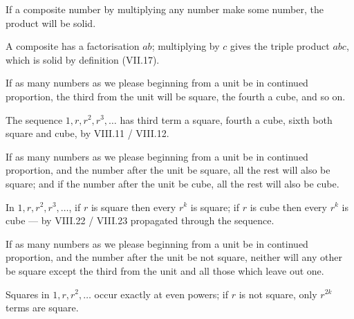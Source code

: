 \documentclass{rrxiv}
\begin{document}
\begin{claim}
\label{prop:IX.7}
If a composite number by multiplying any number make some number,
the product will be solid.
\end{claim}
\begin{evidence}[Proof of IX.7]
\label{ev:IX.7}
A composite has a factorisation $ab$; multiplying by $c$ gives the
triple product $abc$, which is solid by definition (VII.17).
\end{evidence}

\begin{claim}
\label{prop:IX.8}
If as many numbers as we please beginning from a unit be in continued
proportion, the third from the unit will be square, the fourth a
cube, and so on.
\end{claim}
\begin{evidence}[Proof of IX.8]
\label{ev:IX.8}
The sequence $1, r, r^2, r^3, \dots$ has third term a square, fourth
a cube, sixth both square and cube, by VIII.11 / VIII.12.
\end{evidence}

\begin{claim}
\label{prop:IX.9}
If as many numbers as we please beginning from a unit be in continued
proportion, and the number after the unit be square, all the rest
will also be square; and if the number after the unit be cube, all
the rest will also be cube.
\end{claim}
\begin{evidence}[Proof of IX.9]
\label{ev:IX.9}
In $1, r, r^2, r^3, \dots$, if $r$ is square then every $r^k$ is
square; if $r$ is cube then every $r^k$ is cube --- by VIII.22 /
VIII.23 propagated through the sequence.
\end{evidence}

\begin{claim}
\label{prop:IX.10}
If as many numbers as we please beginning from a unit be in continued
proportion, and the number after the unit be not square, neither will
any other be square except the third from the unit and all those
which leave out one.
\end{claim}
\begin{evidence}[Proof of IX.10]
\label{ev:IX.10}
Squares in $1, r, r^2, \dots$ occur exactly at even powers; if $r$
is not square, only $r^{2k}$ terms are square.
\end{evidence}
\end{document}
